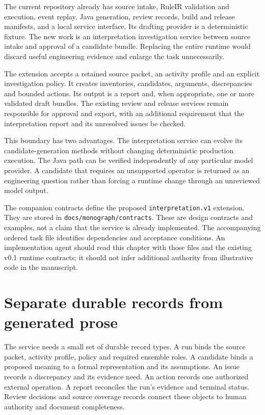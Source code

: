The current repository already has source intake, RuleIR validation and execution,
event replay, Java generation, review records, build and release manifests, and a
local service interface. Its drafting provider is a deterministic fixture. The
new work is an interpretation investigation service between source intake and
approval of a candidate bundle. Replacing the entire runtime would discard useful
engineering evidence and enlarge the task unnecessarily.

The extension accepts a retained source packet, an activity profile and an
explicit investigation policy. It creates inventories, candidates, arguments,
discrepancies and bounded actions. Its output is a report and, when appropriate,
one or more validated draft bundles. The existing review and release services
remain responsible for approval and export, with an additional requirement that
the interpretation report and its unresolved issues be checked.

This boundary has two advantages. The interpretation service can evolve its
candidate-generation methods without changing deterministic production execution.
The Java path can be verified independently of any particular model provider.
A candidate that requires an unsupported operator is returned as an engineering
question rather than forcing a runtime change through an unreviewed model output.

The companion contracts define the proposed \texttt{interpretation.v1} extension.
They are stored in \texttt{docs/monograph/contracts}. These are design contracts
and examples, not
a claim that the service is already implemented. The accompanying ordered task file identifies dependencies and acceptance conditions. An
implementation agent should read this chapter with those files and the existing
v0.1 runtime contracts; it should not infer additional authority from illustrative
code in the manuscript.

\section{Separate durable records from generated prose}
\label{merge:M08:01}


The service needs a small set of durable record types. A run binds the source
packet, activity profile, policy and required ensemble roles. A candidate binds a
proposed meaning to a formal representation and its assumptions. An issue records
a discrepancy and its evidence need. An action records one authorized external
operation. A report reconciles the run's evidence and terminal status. Review
decisions and source coverage records connect these objects to human authority
and document completeness.

